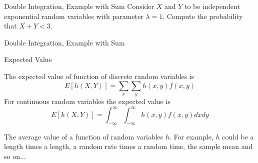 \documentclass[t,handout]{beamer}
\begin{document}
\begin{frame}{Double Integration, Example with Sum}
    Consider $X$ and $Y$ to be independent exponential random variables with parameter $\lambda=1$. Compute the probability that $X+Y<3$.
\end{frame}
\begin{frame}{Double Integration, Example with Sum}
\end{frame}
\begin{frame}[c]{Expected Value}
    \begin{block}{}
        The expected value of function of discrete random variables is
        $$ E[h(X,Y)] = \sum_{x} \sum_{y} h(x,y) f(x,y) $$
        For continuous random variables the expected value is
        $$ E[h(X,Y)] = \int_{-\infty}^\infty \int_{-\infty}^\infty  h(x,y) f(x,y) dx dy$$
    \end{block}
    The average value of a function of random variables $h$. For example, $h$ could be a length times a length, a random rate times a random time, the sample mean and so on...
\end{frame}
\end{document}
